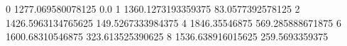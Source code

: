 0 1277.069580078125 0.0
1 1360.1273193359375 83.0577392578125
2 1426.5963134765625 149.5267333984375
4 1846.35546875 569.285888671875
6 1600.68310546875 323.613525390625
8 1536.638916015625 259.5693359375
